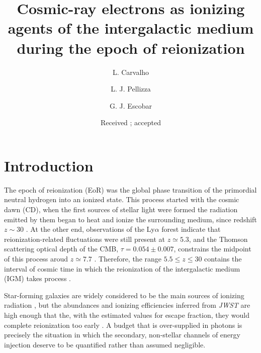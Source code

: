 \documentclass{aa}
\begin{document}
   \title{Cosmic-ray electrons as ionizing agents of the intergalactic
          medium during the epoch of reionization}

   \subtitle{}

   \author{L. Carvalho 
        \and L. J. Pellizza 
        \and G. J. Escobar 
        }


   \date{Received ; accepted }

  \abstract
   {}
   {}
   {}
   {}
   {}


   \maketitle

\section{Introduction}
\label{sec:intro}

The epoch of reionization (EoR) was the global phase transition of the
primordial neutral hydrogen into an ionized state. This process started with
the cosmic dawn (CD), when the first sources of stellar light were formed the radiation emitted by them began to heat and ionize the surrounding medium, since redshift $z \sim 30$ \citep{Bromm2013,Klessen2023}. At the other end, observations of the Ly$\alpha$ forest indicate that reionization-related fluctuations were still present at $z \simeq 5.3$, and the Thomson scattering optical depth of the CMB, $\tau = 0.054 \pm 0.007$, constrains the midpoint of this process aroud $z \simeq 7.7$ \citep{Bosman2022,Planck2020}. Therefore, the range $5.5 \le z \le 30$ contains
the interval of cosmic time in which the reionization of the intergalactic medium (IGM) takes process
\citep{Robertson2022,Klessen2023}.


Star-forming galaxies are widely considered to be the main sources of ionizing radiation \citep{Robertson2022}, but the
abundances and ionizing efficiencies inferred from \emph{JWST} are high enough that the, with the estimated values for escape fraction, they would complete reionization too early \citep{Munoz2024}. A budget that is over-supplied in photons is precisely the situation in which the secondary, non-stellar channels of energy injection deserve to be quantified rather than assumed negligible.
\end{document}
